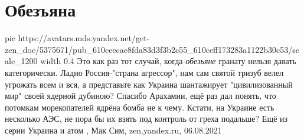  
 
 
 
 
\chapter{Обезъяна}

\ifcmt
  pic https://avatars.mds.yandex.net/get-zen_doc/5375671/pub_610ceecae8fda83d3f3b2c55_610ceff173283a1122b30c53/scale_1200
  width 0.4
\fi
Это как раз тот случай, когда \emph{обезьяне} гранату нельзя давать
категорически.  Ладно Россия-"страна агрессор", нам сам святой тризуб велел
угрожать всем и вся, а представьте как Украина шантажирует "цивилизованный мир"
своей ядерной дубиною? Спасибо Арахамии, ещё раз дал понять, что потомкам
морекопателей ядрёна бомба не к чему. Кстати, на Украине есть несколько АЭС, не
пора бы их взять под контроль от греха подальше? Ещё из серии Украина и атом
, 
Мак Сим, zen.yandex.ru, 06.08.2021
